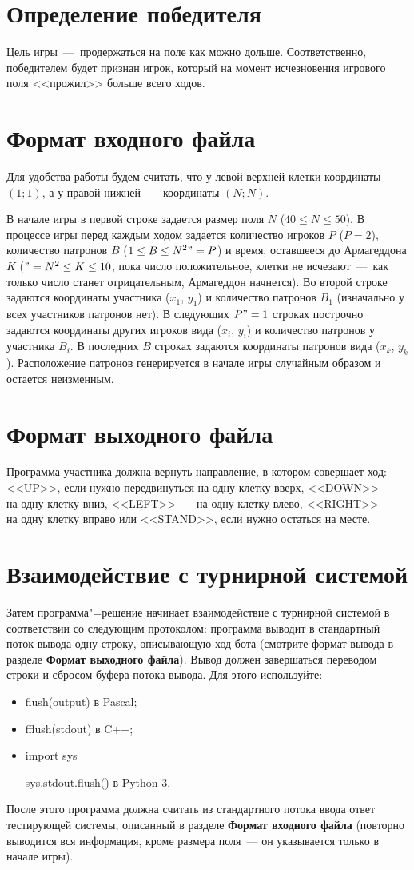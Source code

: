 \documentclass[a4paper,12pt]{article}
\begin{document}
\section{Определение победителя}
Цель игры~---~продержаться на поле как можно дольше. Соответственно, победителем будет признан игрок, который на момент исчезновения игрового поля <<прожил>> больше всего ходов.

\section{Формат входного файла}
Для удобства работы будем считать, что у левой верхней клетки координаты $(1;1)$, а у правой нижней~---~координаты $(N;N)$.

В начале игры в первой строке задается размер поля $N$ ($40 \leq N \leq 50$). В процессе игры перед каждым ходом задается количество игроков $P$ ($P = 2$), количество патронов $B$ ($1 \leq B \leq N^2"=P$) и время, оставшееся до Армагеддона $K$ ($"=N^2 \leq K \leq 10$, пока число положительное, клетки не исчезают~---~как только число станет отрицательным, Армагеддон начнется).
Во второй строке задаются координаты участника ($x_1$, $y_1$) и количество патронов $B_1$ (изначально у всех участников патронов нет).
В следующих $P"=1$ строках построчно задаются координаты других игроков вида ($x_i$, $y_i$) и количество патронов у участника $B_i$.
В последних $B$ строках задаются координаты патронов вида ($x_k$, $y_k$). Расположение патронов генерируется в начале игры случайным образом и остается неизменным.

\section{Формат выходного файла}
Программа участника должна вернуть направление, в котором совершает ход: <<UP>>, если нужно передвинуться на одну клетку вверх, <<DOWN>>~--- на одну клетку вниз, <<LEFT>>~--- на одну клетку влево, <<RIGHT>>~--- на одну клетку вправо или <<STAND>>, если нужно остаться на месте.

\section{Взаимодействие с турнирной системой}
Затем программа"=решение начинает взаимодействие с турнирной системой в соответствии со следующим протоколом:
программа выводит в стандартный поток вывода одну строку, описывающую ход бота (смотрите формат вывода в разделе \textbf{Формат выходного файла}). Вывод должен завершаться переводом строки и сбросом буфера потока
вывода. Для этого используйте:
\begin{itemize}
\item flush(output) в Pascal;
\item fflush(stdout) в C++;
\item import sys
      
      sys.stdout.flush() в Python 3.
\end{itemize}
После этого программа должна считать из стандартного потока ввода ответ тестирующей системы, описанный в разделе \textbf{Формат входного файла} (повторно выводится вся информация, кроме размера поля~--- он указывается только в начале игры).
\end{document}
